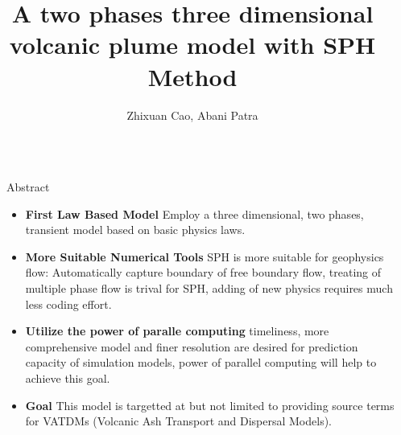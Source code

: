 \documentclass[final]{beamer}
\title{A two phases three dimensional volcanic plume model with SPH Method} %
\author{Zhixuan Cao, Abani Patra} %
\institute{Department Aerospace and Mechinical Engineering, University at Buffalo, SUNY} %
\newlength{\sepwid}
\newlength{\onecolwid}
\begin{document}

\setlength{\belowcaptionskip}{2ex} %
\setlength\belowdisplayshortskip{2ex} %

\begin{frame}[t] %

\begin{columns}[t] %

\begin{column}{\sepwid}\end{column} %

\begin{column}{\onecolwid} %


\begin{alertblock}{Abstract}
\begin{itemize}
\item \textbf{First Law Based Model} Employ a three dimensional, two phases, transient model based on basic physics laws.\
\item \textbf{More Suitable Numerical Tools} SPH is more suitable for geophysics flow: Automatically capture boundary of free boundary flow, treating of multiple phase flow is trival for SPH, adding of new physics requires much less coding effort.\
\item \textbf{Utilize the power of paralle computing} timeliness, more comprehensive model and finer resolution are desired for prediction capacity of simulation models, power of parallel computing will help to achieve this goal.
\item \textbf{Goal} This model is targetted at but not limited to providing source terms for VATDMs (Volcanic Ash Transport and Dispersal Models).
\end{itemize}
\end{alertblock}


\end{column}
\end{columns}
\end{frame}
\end{document}
